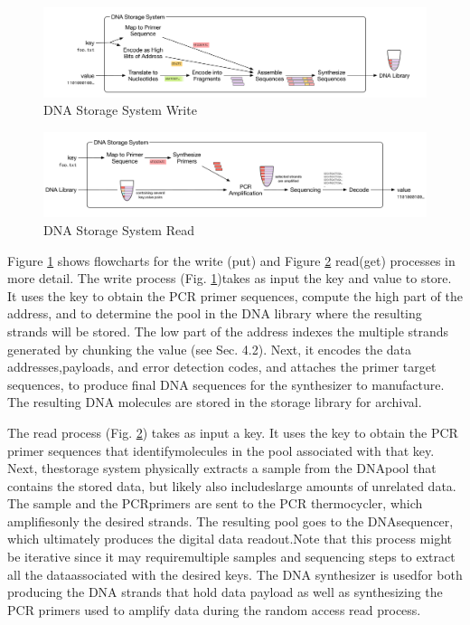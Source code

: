 \documentclass[a4paper]{article}
\begin{document}
\begin{figure}[h!]
    \centering
      \includegraphics[width=1.1\textwidth]{write}
      \caption{DNA Storage System Write}
      \label{fig:write}
  \end{figure}
  \begin{figure}[h!]
    \centering
      \includegraphics[width=1.1\textwidth]{read}
      \caption{DNA Storage System Read}
      \label{fig:read}
  \end{figure}

 Figure \ref{fig:write} shows flowcharts for the write (put) and Figure \ref{fig:read} read(get) processes in more detail. The write process (Fig. \ref{fig:write})takes as input the key and value to store. It uses the key to obtain the PCR primer sequences, compute the high part of the address, and to determine the pool in the DNA library where the resulting strands will be stored. The low part of the address indexes the multiple strands generated by chunking the value (see Sec. 4.2). Next, it encodes the data addresses,payloads, and error detection codes, and attaches the primer target sequences, to produce final DNA sequences for the synthesizer to manufacture. The resulting DNA molecules are stored in the storage library for archival.

 The read process (Fig. \ref{fig:read}) takes as input a key. It uses the key to obtain the PCR primer sequences that identifymolecules in the pool associated with that key. Next, thestorage system physically extracts a sample from the DNApool that contains the stored data, but likely also includeslarge amounts of unrelated data. The sample and the PCRprimers are sent to the PCR thermocycler, which amplifiesonly the desired strands. The resulting pool goes to the DNAsequencer, which ultimately produces the digital data readout.Note that this process might be iterative since it may requiremultiple samples and sequencing steps to extract all the dataassociated with the desired keys. The DNA synthesizer is usedfor both producing the DNA strands that hold data payload as well as synthesizing the PCR primers used to amplify data during the random access read process.
\end{document}
